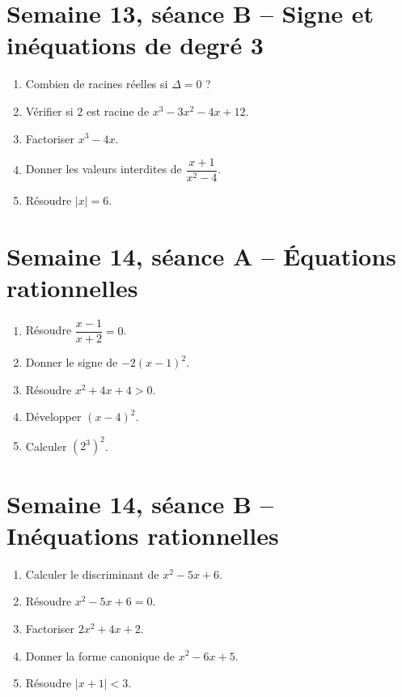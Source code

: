 \section{Semaine 13, séance B -- Signe et inéquations de degré 3}
\begin{enumerate}
  \item Combien de racines réelles si $\Delta=0$ ?
  \item Vérifier si $2$ est racine de $x^3-3x^2-4x+12$.
  \item Factoriser $x^3-4x$.
  \item Donner les valeurs interdites de $\dfrac{x+1}{x^2-4}$.
  \item Résoudre $|x|=6$.
\end{enumerate}

\section{Semaine 14, séance A -- Équations rationnelles}
\begin{enumerate}
  \item Résoudre $\dfrac{x-1}{x+2}=0$.
  \item Donner le signe de $-2(x-1)^2$.
  \item Résoudre $x^2+4x+4>0$.
  \item Développer $(x-4)^2$.
  \item Calculer $(2^3)^2$.
\end{enumerate}

\section{Semaine 14, séance B -- Inéquations rationnelles}
\begin{enumerate}
  \item Calculer le discriminant de $x^2-5x+6$.
  \item Résoudre $x^2-5x+6=0$.
  \item Factoriser $2x^2+4x+2$.
  \item Donner la forme canonique de $x^2-6x+5$.
  \item Résoudre $|x+1|<3$.
\end{enumerate}
\TeacherOnly{%
\begin{tcolorbox}[colback=VE!3,colframe=VE!35,boxrule=.4pt,arc=1mm]
\small\textit{Réponses.}\quad \textbf{1.} $\Delta=1$. \quad \textbf{2.} $x=2$ ou $x=3$. \quad \textbf{3.} $2(x+1)^2$. \quad \textbf{4.} $(x-3)^2-4$. \quad \textbf{5.} $x\in]-4;2[$.
\end{tcolorbox}}

